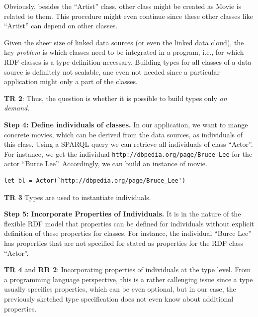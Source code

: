 \documentclass{llncs} %
\newcommand{\rr}[1]{\textbf{RR #1}}
\newcommand{\tr}[1]{\textbf{TR #1}}
\begin{document}
Obviously, besides the ``Artist'' class, other class might be created as Movie is related to them. This procedure might even continue since
these other classes like ``Artist'' can depend on other classes.

Given the sheer size of linked data sources (or even the linked data cloud), the key \emph{problem} is which classes need to be 
integrated in a program, i.e., for which RDF classes is a type definition necessary. Building types for all classes of a
data source is definitely not scalable, ane even not needed since a particular application 
might only a part of the classes.

\tr{2}: Thus, the question is whether it is possible to build types only \emph{on demand}.

\vspace{0.8em}
\noindent
\textbf{Step 4: Define individuals of classes.}
In our application, we want to mange concrete movies, which can be derived from the data sources,
as individuals of this class. Using a SPARQL query we can retrieve all individuals of class ``Actor''.
For instance, we get the individual \texttt{http://dbpedia.org/page/Bruce\_Lee} for the actor ``Burce Lee''.
Accordingly, we can build an instance of movie.

\begin{lstlisting}[style=code, caption={Individual of  ``Actor'' }, label={lst:skyfall}]
let bl = Actor(`http://dbpedia.org/page/Bruce_Lee')
\end{lstlisting}

\tr{3} Types are used to instantiate individuals. 

\vspace{0.8em}
\noindent
\textbf{Step 5: Incorporate Properties of Individuals.}
It is in the nature of the flexible RDF model that properties can be defined for individuals 
without explicit definition of these properties for classes. For instance, the individual
``Burce Lee'' has properties that are not specified for stated as properties for the RDF class ``Actor''.

\tr{4} and \rr{2}: Incorporating properties of individuals at the type level. From a programming language perspective,
this is a rather callenging issue since a type usually specifies properties, which can be even optional,
but in our case, the previously sketched type specification does not even know about additional properties.
\end{document}
